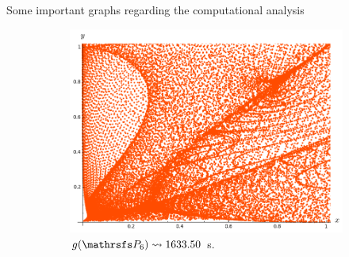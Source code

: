 \documentclass[final]{beamer}
\newlength{\onecolwid}
\newlength{\twocolwid}
\begin{document}
\begin{frame}[t]
\begin{columns}[t]
\begin{column}{\twocolwid}
\begin{columns}[t,totalwidth=\twocolwid]
\begin{column}{\onecolwid}
\end{column} %
 
\end{columns} %

 \vspace{-1cm}


\begin{alertblock}{Some important graphs regarding the computational analysis}
\begin{center}

\begin{figure}
\vspace{-0.2cm}
\begin{subfigure}{.28\linewidth}\centering
\includegraphics[width=1\textwidth]{plots/ch5_17_P6prime.png}
\vspace{-0.1cm}\caption{$g(\PP_6) \leadsto 1633.50$ s.}
\end{subfigure}
\hspace{2cm}
\begin{subfigure}{.28\linewidth}\centering

\end{subfigure}
\end{figure}
\end{center}
\end{alertblock}
\end{column}
\end{columns}
\end{frame}
\end{document}
